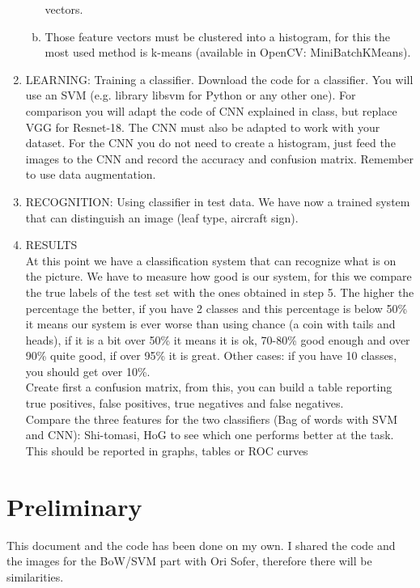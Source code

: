 \documentclass[UTF-8]{article}
\begin{document}
\begin{enumerate}[1.]
\begin{enumerate}[a.]
			vectors.
			\item Those  feature  vectors  must  be  clustered  into  a  histogram,  for  this  the  most  used 
			method is k-means (available in OpenCV: MiniBatchKMeans).
		\end{enumerate}
		\item LEARNING: Training a classifier. Download the code for a classifier. You will use an 
		SVM  (e.g.  library  libsvm  for  Python  or  any  other  one).  For  comparison  you  will 
		adapt the code of CNN explained in class, but replace VGG for Resnet-18. The CNN 
		must  also  be  adapted  to  work  with  your  dataset.  For  the  CNN  you  do  not  need  to 
		create  a  histogram,  just  feed  the  images  to  the  CNN  and  record  the  accuracy  and 
		confusion matrix. Remember to use data augmentation.
		\item RECOGNITION: Using classifier in test data. We have now a trained system that can 
		distinguish an image (leaf type, aircraft sign).
		\item RESULTS\\
		At  this  point  we  have  a  classification  system  that  can  recognize  what  is  on  the 
		picture. We have to measure how good is our system, for this we compare the true 
		labels  of  the  test  set  with  the  ones  obtained  in  step  5. The  higher  the  percentage 
		the  better,  if  you  have  2  classes  and  this  percentage  is  below  50\%  it  means  our 
		system is ever worse than using chance (a coin with tails and heads), if it is a bit 
		over 50\% it means it is ok, 70-80\% good enough and over 90\% quite good, if over 
		95\% it is great. Other cases: if you have 10 classes, you should get over 10\%.\\
		Create  first  a  confusion  matrix,  from  this,  you  can  build  a  table  reporting  true 
		positives, false positives, true negatives and false negatives.\\
		Compare  the  three  features  for  the  two  classifiers  (Bag  of  words  with  SVM  and 
		CNN): Shi-tomasi, HoG to see which one performs better at the task. This should 
		be reported in graphs, tables or ROC curves
	\end{enumerate}
\newpage
\section{Preliminary}
This document and the code has been done on my own. I shared the code and the images for the BoW/SVM part with Ori Sofer, therefore there will be similarities.
\end{document}
